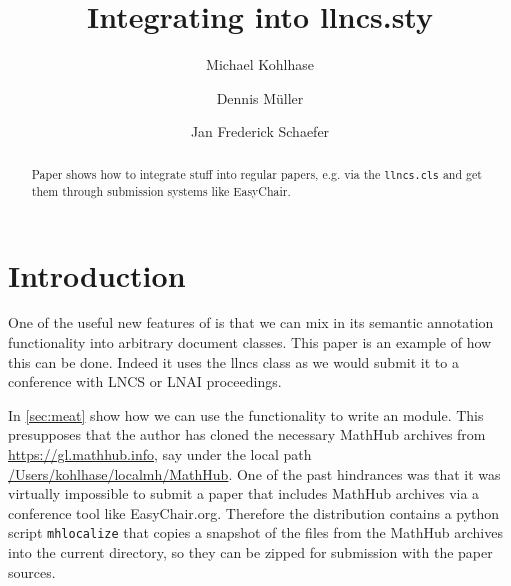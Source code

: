 \documentclass{llncs}
\title{Integrating \protect\sTeX into llncs.sty}
\author{Michael Kohlhase\orcidID{0000-0002-9859-6337} \and Dennis M\"uller\orcidID{0000-0002-4482-4912} \and Jan Frederick Schaefer}
\institute{Computer Science, FAU  Erlangen-N\"urnberg}
\begin{document}
\maketitle
\begin{abstract}
  Paper shows how to integrate \sTeX stuff into regular papers, e.g. via the
  \texttt{llncs.cls} and get them through submission systems like EasyChair.
\end{abstract}

\section{Introduction}\label{sec:intro}

One of the useful new features of \sTeX is that we can mix in its semantic annotation
functionality into arbitrary document classes. This paper is an example of how this can be
done. Indeed it uses the \textsf{llncs} class as we would submit it to a conference with
LNCS or LNAI proceedings.

In \cref{sec:meat} show how we can use the \sTeX functionality to write an \sTeX module.
This presupposes that the author has cloned the necessary MathHub archives from
\url{https://gl.mathhub.info}, say under the local path
\url{/Users/kohlhase/localmh/MathHub}. One of the past hindrances was that it was
virtually impossible to submit a paper that includes MathHub archives via a conference
tool like EasyChair.org. Therefore the \sTeX distribution contains a python script
\texttt{mhlocalize} that copies a snapshot of the \sTeX files from the MathHub archives
into the current directory, so they can be zipped for submission with the paper sources. 
\end{document}
